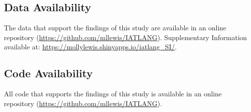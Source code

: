 \documentclass[9pt,twocolumn,twoside,lineno]{pnas-new}
\begin{document}
\showmatmethods{} %

\subsection*{Data Availability}

The data that support the findings of this study are available in an online repository (\url{https://github.com/mllewis/IATLANG}). Supplementary Information available at:  \url{https://mollylewis.shinyapps.io/iatlang_SI/}. 

\subsection*{Code Availability}
All code that supports the findings of this study is available in an online repository (\url{https://github.com/mllewis/IATLANG}).

\showacknow{} %


\end{document}

